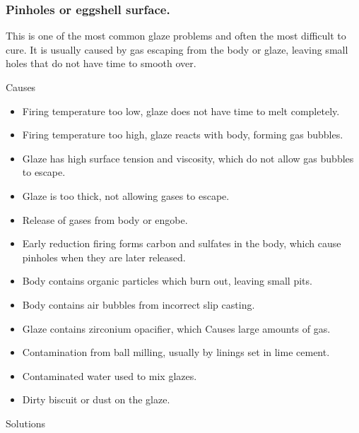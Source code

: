 \subsubsection{Pinholes or eggshell surface.}
This is one of the most common glaze problems and often the most difficult to 
cure. It is usually caused by gas escaping from the body or glaze, leaving 
small holes that do not have time to smooth over.

Causes
\begin{itemize}
\item Firing temperature too low, glaze does not have time to melt completely.
\item Firing temperature too high, glaze reacts with body, forming gas bubbles.
\item Glaze has high surface tension and viscosity, which do not allow gas 
bubbles to escape.
\item Glaze is too thick, not allowing gases to escape.
\item Release of gases from body or engobe.
\item Early reduction firing forms carbon and sulfates in the body, which cause 
pinholes when they are later released.
\item Body contains organic particles which burn out, leaving small pits.
\item Body contains air bubbles from incorrect slip casting.
\item Glaze contains zirconium opacifier, which Causes large amounts of gas.
\item Contamination from ball milling, usually by linings set in lime cement.
\item Contaminated water used to mix glazes.
\item Dirty biscuit or dust on the glaze.
\end{itemize}
Solutions
